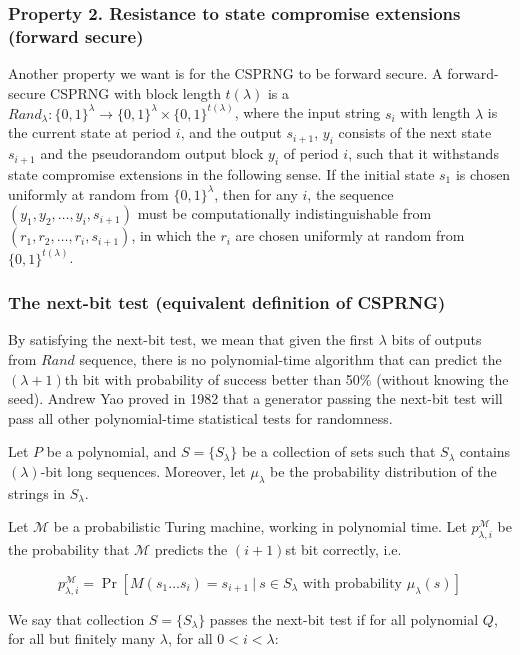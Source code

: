 \documentclass{article}
\begin{document}
\subsubsection*{Property 2. Resistance to state compromise extensions (forward secure)}
Another property we want is for the CSPRNG to be forward secure. A forward-secure CSPRNG with block length $t(\lambda)$ is a $Rand_{\lambda} \colon \{0,1\}^\lambda \to \{0,1\}^\lambda \times \{0,1\}^{t(\lambda)}$, where the input string $s_i$ with length $\lambda$ is the current state at period $i$, and the output $s_{i+1}$, $y_i$ consists of the next state $s_{i+1}$ and the pseudorandom output block $y_i$ of period $i$, such that it withstands state compromise extensions in the following sense. If the initial state $s_1$ is chosen uniformly at random from $\{0,1\}^\lambda$, then for any $i$, the sequence $(y_1, y_2,\dots, y_i,s_{i+1})$ must be computationally indistinguishable from $(r_1,r_2,\dots,r_i,s_{i+1})$, in which the $r_i$ are chosen uniformly at random from $\{0,1\}^{t(\lambda)}$.

\subsubsection*{The next-bit test (equivalent definition of CSPRNG)}
By satisfying the next-bit test, we mean that given the first $\lambda$ bits of outputs from $Rand$ sequence, there is no polynomial-time algorithm that can predict the $(\lambda+1)$th bit with probability of success better than 50\% (without knowing the seed). Andrew Yao proved in 1982 that a generator passing the next-bit test will pass all other polynomial-time statistical tests for randomness.

Let $P$ be a polynomial, and $S=\{S_\lambda\}$ be a collection of sets such that $S_\lambda$ contains $(\lambda)$-bit long sequences. Moreover, let $\mu_\lambda$ be the probability distribution of the strings in $S_\lambda$.

Let $\mathcal{M}$ be a probabilistic Turing machine, working in polynomial time. Let $p_{\lambda,i}^{\mathcal{M}}$ be the probability that $\mathcal{M}$ predicts the $(i+1)$st bit correctly, i.e.

$$p_{\lambda,i}^{\mathcal{M}}=\Pr[M(s_1\ldots s_i)=s_{i+1}\ | \ s\in S_\lambda\text{ with probability }\mu_\lambda(s)]$$

We say that collection $S = \{ S_\lambda \}$ passes the next-bit test if for all polynomial $Q$, for all but finitely many $\lambda$, for all $0 < i < \lambda$: 
\end{document}

